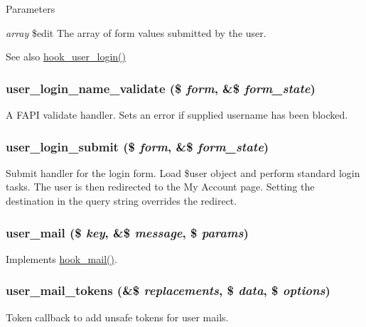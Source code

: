 \begin{DoxyParams}{Parameters}
\item[{\em array}]\$edit The array of form values submitted by the user.\end{DoxyParams}
\begin{DoxySeeAlso}{See also}
\hyperlink{group__hooks_ga8cce712a39ee6e57bd506b5a0c457d09}{hook\_\-user\_\-login()} 
\end{DoxySeeAlso}
\hypertarget{user_8module_a8f96305420b1d860053ed6eaa50b8b34}{
\subsubsection[{user\_\-login\_\-name\_\-validate}]{\setlength{\rightskip}{0pt plus 5cm}user\_\-login\_\-name\_\-validate (\$ {\em form}, \/  \&\$ {\em form\_\-state})}}
\label{user_8module_a8f96305420b1d860053ed6eaa50b8b34}
A FAPI validate handler. Sets an error if supplied username has been blocked. \hypertarget{user_8module_a84bba9d490507784160b5f3fc3d73f2f}{
\subsubsection[{user\_\-login\_\-submit}]{\setlength{\rightskip}{0pt plus 5cm}user\_\-login\_\-submit (\$ {\em form}, \/  \&\$ {\em form\_\-state})}}
\label{user_8module_a84bba9d490507784160b5f3fc3d73f2f}
Submit handler for the login form. Load \$user object and perform standard login tasks. The user is then redirected to the My Account page. Setting the destination in the query string overrides the redirect. \hypertarget{user_8module_a1398b4fdee5dad70d6da89ce5be6c43d}{
\subsubsection[{user\_\-mail}]{\setlength{\rightskip}{0pt plus 5cm}user\_\-mail (\$ {\em key}, \/  \&\$ {\em message}, \/  \$ {\em params})}}
\label{user_8module_a1398b4fdee5dad70d6da89ce5be6c43d}
Implements \hyperlink{group__hooks_gacdeb1cba0d0a86ac4de3fff7d4765777}{hook\_\-mail()}. \hypertarget{user_8module_a0685343e7877f453320a935cb2d9c5d1}{
\subsubsection[{user\_\-mail\_\-tokens}]{\setlength{\rightskip}{0pt plus 5cm}user\_\-mail\_\-tokens (\&\$ {\em replacements}, \/  \$ {\em data}, \/  \$ {\em options})}}
\label{user_8module_a0685343e7877f453320a935cb2d9c5d1}
Token callback to add unsafe tokens for user mails.

